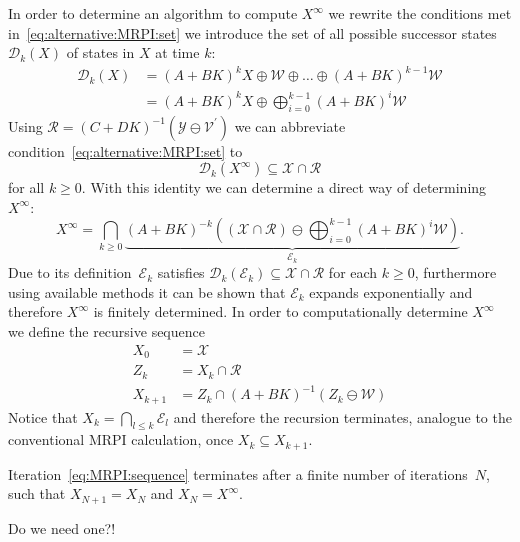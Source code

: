 \documentclass{ifacconf}
\providecommand{\E}{\mathcal E}
\providecommand{\W}{\mathcal W}
\providecommand{\V}{\mathcal V}
\providecommand{\X}{\mathcal X}
\providecommand{\Y}{\mathcal Y}
\providecommand{\R}{\mathcal R}
\providecommand{\D}{\mathscr D}
\begin{document}
In order to determine an algorithm to compute $X^\infty$ we rewrite the conditions met in~\eqref{eq:alternative:MRPI:set} we introduce the set of all possible successor states~$\D_k(X)$ of states in $X$ at time $k$:
%
\begin{equation}\begin{split}
	\D_k(X) &= (A+BK)^{k}X\oplus\W\oplus\dots\oplus(A+BK)^{k-1}\W\\
	&= (A+BK)^k X\oplus \bigoplus_{i=0}^{k-1}(A+BK)^i\W
\end{split}\end{equation}
%
Using $\R = (C+DK)^{-1}(\Y\ominus\V^\prime)$ we can abbreviate condition~\eqref{eq:alternative:MRPI:set} to
%
\begin{equation}\label{eq:containment:condition:alternative:MRPI}
\D_k(X^\infty)\subseteq\X\cap\R
\end{equation}
%
for all $k\geq0$.
%
With this identity we can determine a direct way of determining $X^\infty$:
%
\begin{equation}\label{eq:direct:formulation:MRPI:with:intersection}
	X^\infty = \bigcap_{k\geq0}\underbrace{(A+BK)^{-k}\left((\X\cap\R)\ominus\bigoplus_{i=0}^{k-1}(A+BK)^i\W\right)}_{\E_k}.
\end{equation}
%
Due to its definition~$\E_k$ satisfies $\D_k(\E_k)\subseteq\X\cap\R$ for each $k\geq0$, furthermore using available methods it can be shown that $\E_k$ expands exponentially and therefore $X^\infty$ is finitely determined.
%
In order to computationally determine $X^\infty$ we define the recursive sequence
%
\begin{equation}\label{eq:MRPI:sequence}
	\begin{split}
	X_0 &= \X\\
	Z_k &= X_k\cap\R\\
	X_{k+1} &= Z_k\cap(A+BK)^{-1}(Z_k\ominus\W)
	\end{split}
\end{equation}
%
Notice that $X_k = \bigcap_{l\leq k}\E_l$ and therefore the recursion terminates, analogue to the conventional MRPI calculation, once $X_k\subseteq X_{k+1}$.

\begin{thm}
Iteration~\eqref{eq:MRPI:sequence} terminates after a finite number of iterations~$N$, such that $X_{N+1}=X_N$ and $X_N=X^\infty$.
\end{thm}
%
\begin{pf}
Do we need one?!
\end{pf}
\end{document}
